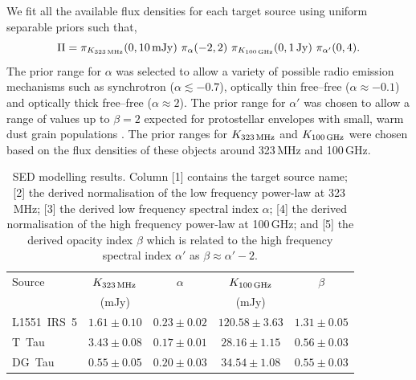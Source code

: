 \documentclass[9pt]{extarticle}   	%
\begin{document}
We fit all the available flux densities for each target source using uniform separable priors such that,
\begin{equation}
\Pi = \pi_{K_{323\,\rm{MHz}}}(0, 10\,{\rm mJy})~\pi_{\alpha}(-2, 2)~\pi_{K_{100\,\rm{GHz}}}(0, 1\,{\rm Jy})~\pi_{\alpha'}(0, 4). \nonumber
\end{equation}
The prior range for $\alpha$ was selected to allow a variety of possible radio emission mechanisms such as synchrotron ($\alpha\lesssim-0.7$), optically thin free--free ($\alpha\approx-0.1$) and optically thick free--free ($\alpha\approx2$). The prior range for $\alpha'$ was chosen to allow a range of values up to $\beta=2$ expected for protostellar envelopes with small, warm dust grain populations \citep[e.g.][]{2013MNRAS.435.1139S}. The prior ranges for $K_{323\,\rm{MHz}}$ and $K_{100\,\rm{GHz}}$ were chosen based on the flux densities of these objects around 323\,MHz and 100\,GHz. 

\vspace{10mm}
\begin{table}[h!]
\centering
\caption{SED modelling results. Column [1] contains the target source name; [2] the derived normalisation of the low frequency power-law at 323\,MHz; [3] the derived low frequency spectral index $\alpha$; [4] the derived normalisation of the high frequency power-law at 100\,GHz; and [5] the derived opacity index $\beta$ which is related to the high frequency spectral index $\alpha'$ as $\beta\approx\alpha'-2$.}
\label{tab:SEDresults}
\begin{tabular}{lcccc} 
\hline
Source & $K_{323\,\rm{MHz}}$ & $\alpha$ & $K_{100\,\rm{GHz}}$ & $\beta$  \\
	& (mJy) & & (mJy) & \\ 
\hline
L1551~IRS~5 	& $1.61\pm0.10$ & $0.23\pm0.02$ & $120.58\pm3.63$ & $1.31\pm0.05$  \\
T~Tau 		& $3.43\pm0.08$ & $0.17\pm0.01$ & $28.16\pm1.15$ & $0.56\pm0.03$  \\
DG~Tau 		& $0.55\pm0.05$ & $0.20\pm0.03$ & $34.54\pm1.08$ & $0.55\pm0.03$  \\
\hline
\end{tabular}
\end{table}


\clearpage
\end{document}
